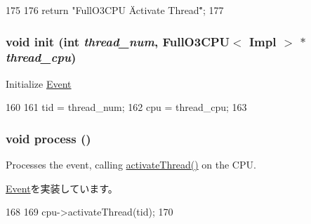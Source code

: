 \begin{DoxyCode}
175 {
176     return "FullO3CPU \"Activate Thread\"";
177 }
\end{DoxyCode}
\hypertarget{classFullO3CPU_1_1ActivateThreadEvent_a0938c51f296f212d5f6f05d174558612}{
\subsubsection[{init}]{\setlength{\rightskip}{0pt plus 5cm}void init (int {\em thread\_\-num}, \/  {\bf FullO3CPU}$<$ Impl $>$ $\ast$ {\em thread\_\-cpu})}}
\label{classFullO3CPU_1_1ActivateThreadEvent_a0938c51f296f212d5f6f05d174558612}
Initialize \hyperlink{classEvent}{Event} 


\begin{DoxyCode}
160 {
161     tid = thread_num;
162     cpu = thread_cpu;
163 }
\end{DoxyCode}
\hypertarget{classFullO3CPU_1_1ActivateThreadEvent_a2e9c5136d19b1a95fc427e0852deab5c}{
\subsubsection[{process}]{\setlength{\rightskip}{0pt plus 5cm}void process ()}}
\label{classFullO3CPU_1_1ActivateThreadEvent_a2e9c5136d19b1a95fc427e0852deab5c}
Processes the event, calling \hyperlink{classFullO3CPU_a687aa4600423bb30ecf3bb1da6cd6000}{activateThread()} on the CPU. 

\hyperlink{classEvent_a142b75b68a6291400e20fb0dd905b1c8}{Event}を実装しています。


\begin{DoxyCode}
168 {
169     cpu->activateThread(tid);
170 }
\end{DoxyCode}



